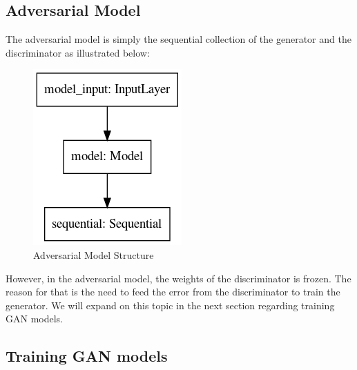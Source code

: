 \documentclass[12pt,oneside]{chicagocapstone}
\begin{document}
\hypertarget{adversarial-model}{%
\subsection*{Adversarial Model}\label{adversarial-model}}

The adversarial model is simply the sequential collection of the generator and the discriminator as illustrated below:
\begin{figure}

{\centering \includegraphics[width=0.3\linewidth]{figure/gan_model} 

}

\caption{Adversarial Model Structure}\label{fig:unnamed-chunk-7}
\end{figure}
However, in the adversarial model, the weights of the discriminator is frozen. The reason for that is the need to feed the error from the discriminator to train the generator. We will expand on this topic in the next section regarding training GAN models.

\hypertarget{training-gan-models}{%
\subsection*{Training GAN models}\label{training-gan-models}}
\end{document}
